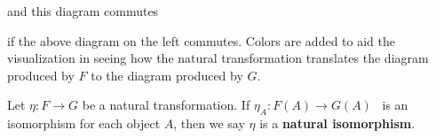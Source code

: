     and this diagram commutes
    \begin{center}
        \hspace{1cm}
    \end{center}
    if the above diagram on the left commutes. Colors are added to aid
    the visualization in seeing how the natural transformation
    translates the diagram produced by $F$ to the diagram produced by
    $G$. 
        
    \begin{definition}
        Let $\eta: F \to G$ be a natural transformation. If $\eta_A: F(A) \to G(A)$ \
        is an isomorphism for each object $A$, then we say $\eta$ is a \textbf{natural isomorphism}.
    \end{definition}


